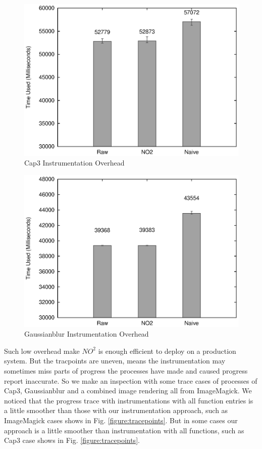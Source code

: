 \begin{figure}
\centering
  \includegraphics[width=0.9\columnwidth]{figures/overhead_cap3.eps}
\caption{Cap3 Instrumentation Overhead}
\label{figure:overhead_cap3}
\end{figure}

\begin{figure}
\centering
  \includegraphics[width=0.9\columnwidth]{figures/overhead_gaussianblur.eps}
\caption{Gaussianblur Instrumentation Overhead}
\label{figure:overhead_gaussianblur}
\end{figure}

Such low overhead make $NO^2$ is enough efficient to deploy on a production system. But the tracpoints are uneven, means the instrumentation may sometimes miss parts of progress the processes have made and caused progress report inaccurate. So we make an inspection with some trace cases of processes of Cap3, Gaussianblur and a combined image rendering all from ImageMagick. We noticed that the progress trace with instrumentations with all function entries is a little smoother than those with our instrumentation approach, such as ImageMagick cases shows in Fig. \ref{figure:tracepoints}. But in some cases our approach is a little smoother than instrumentation with all functions, such as Cap3 case shows in Fig. \ref{figure:tracepoints}.


